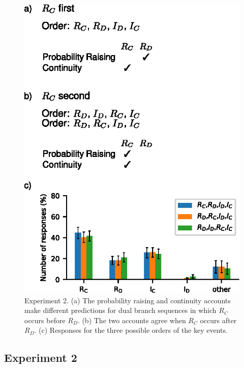 \documentclass[10pt,letterpaper]{article}
\newcommand{\ev}[2]{$#1_#2$}
\begin{document}
\begin{figure}[t]
\begin{center}
\includegraphics{figures/expt2test.eps}
\end{center}
\vspace{-0.1in}
\caption{Experiment 2. (a) The probability raising and continuity accounts make different predictions for dual branch sequences in which \ev{R}{C} occurs before \ev{R}{D}. (b) The two accounts agree when \ev{R}{C} occurs after \ev{R}{D}.
(c) Responses for the three possible orders of the key events.} 
\label{fig:expt2}
\end{figure}



\subsection{Experiment 2}
\end{document}
